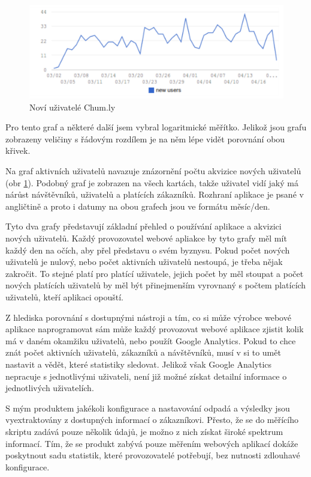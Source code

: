 \documentclass[bc,male,java,dept456]{diploma}						%
\begin{document}
\begin{figure}[h]
	\centering
	\includegraphics[width=13.45cm]{img/ud_new_users.pdf}
	\caption{Noví uživatelé Chum.ly}
	\label{img:chumly_new_users}
\end{figure}

Pro tento graf a některé další jsem vybral logaritmické měřítko. Jelikož jsou grafu zobrazeny veličiny s řádovým rozdílem je na něm lépe vidět porovnání obou křivek.

Na graf aktivních uživatelů navazuje znázornění počtu akvizice nových uživatelů (obr \ref{img:chumly_new_users}). Podobný graf je zobrazen na všech kartách, takže uživatel vidí jaký má nárůst návštěvníků, uživatelů a platících zákazníků. Rozhraní aplikace je psané v angličtině a proto i datumy na obou grafech jsou ve formátu měsíc/den. 


Tyto dva grafy představují základní přehled o používání aplikace a akvizici nových uživatelů. Každý provozovatel webové apliakce by tyto grafy měl mít každý den na očích, aby přel představu o svém byznysu. Pokud počet nových uživatelů je nulový, nebo počet aktivních uživatelů nestoupá, je třeba nějak zakročit. To stejné platí pro platící uživatele, jejich počet by měl stoupat a počet nových platících uživatelů by měl být přinejmenším vyrovnaný s počtem platících uživatelů, kteří aplikaci opouští.

Z hlediska porovnání s dostupnými nástroji a tím, co si může výrobce webové aplikace naprogramovat sám může každý provozovat webové aplikace zjistit kolik má v daném okamžiku uživatelů, nebo použít Google Analytics. Pokud to chce znát počet aktivních uživatelů, zákazníků a návštěvníků, musí v si to umět nastavit a vědět, které statistiky sledovat. Jelikož však Google Analytics nepracuje s jednotlivými uživateli, není již možné získat detailní informace o jednotlivých uživatelích.

S mým produktem jakékoli konfigurace a nastavování odpadá a výsledky jsou vyextraktovány z dostupných informací o zákazníkovi. Přesto, že se do měřícího skriptu zadává pouze několik údajů, je možno z nich získat široké spektrum informací. Tím, že se produkt zabývá pouze měřením webových aplikací dokáže poskytnout sadu statistik, které provozovatelé potřebují, bez nutnosti zdlouhavé konfigurace.
\end{document}

